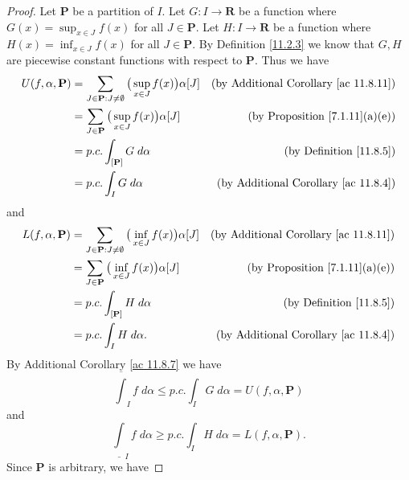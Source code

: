 \begin{proof}
    Let \(\mathbf{P}\) be a partition of \(I\).
    Let \(G : I \to \mathbf{R}\) be a function where \(G(x) = \sup_{x \in J} f(x)\) for all \(J \in \mathbf{P}\).
    Let \(H : I \to \mathbf{R}\) be a function where \(H(x) = \inf_{x \in J} f(x)\) for all \(J \in \mathbf{P}\).
    By Definition \ref{11.2.3} we know that \(G, H\) are piecewise constant functions with respect to \(\mathbf{P}\).
    Thus we have
    \begin{align*}
        U(f, \alpha, \mathbf{P}) & = \sum_{J \in \mathbf{P} : J \neq \emptyset} \big(\sup_{x \in J} f(x)\big) \alpha[J] & \text{(by Additional Corollary \ref{ac 11.8.11})} \\
                                 & = \sum_{J \in \mathbf{P}} \big(\sup_{x \in J} f(x)\big) \alpha[J]                    & \text{(by Proposition \ref{7.1.11}(a)(e))}        \\
                                 & = p.c. \int_{[\mathbf{P}]} G \; d \alpha                                             & \text{(by Definition \ref{11.8.5})}               \\
                                 & = p.c. \int_I G \; d \alpha                                                          & \text{(by Additional Corollary \ref{ac 11.8.4})}
    \end{align*}
    and
    \begin{align*}
        L(f, \alpha, \mathbf{P}) & = \sum_{J \in \mathbf{P} : J \neq \emptyset} \big(\inf_{x \in J} f(x)\big) \alpha[J] & \text{(by Additional Corollary \ref{ac 11.8.11})} \\
                                 & = \sum_{J \in \mathbf{P}} \big(\inf_{x \in J} f(x)\big) \alpha[J]                    & \text{(by Proposition \ref{7.1.11}(a)(e))}        \\
                                 & = p.c. \int_{[\mathbf{P}]} H \; d \alpha                                             & \text{(by Definition \ref{11.8.5})}               \\
                                 & = p.c. \int_I H \; d \alpha.                                                         & \text{(by Additional Corollary \ref{ac 11.8.4})}
    \end{align*}
    By Additional Corollary \ref{ac 11.8.7} we have
    \[
        \overline{\int}_I f \; d \alpha \leq p.c. \int_I G \; d \alpha = U(f, \alpha, \mathbf{P})
    \]
    and
    \[
        \underline{\int}_I f \; d \alpha \geq p.c. \int_I H \; d \alpha = L(f, \alpha, \mathbf{P}).
    \]
    Since \(\mathbf{P}\) is arbitrary, we have

\end{proof}

